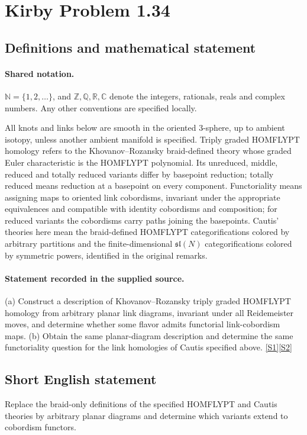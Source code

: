 \documentclass[11pt]{article}
\newcommand{\sref}[2]{\hyperlink{source:#1:#2}{[S#2]}}
\begin{document}
\section{Kirby Problem 1.34}\label{statement}

\subsection{Definitions and mathematical statement}

\paragraph{Shared notation.}$\mathbb N=\{1,2,\ldots\}$, and $\mathbb Z,\mathbb Q,\mathbb R,\mathbb C$ denote the integers, rationals, reals and complex numbers. Any other conventions are specified locally.


All knots and links below are smooth in the oriented $3$-sphere, up to ambient isotopy, unless another ambient manifold is specified. Triply graded HOMFLYPT homology refers to the Khovanov--Rozansky braid-defined theory whose graded Euler characteristic is the HOMFLYPT polynomial. Its unreduced, middle, reduced and totally reduced variants differ by basepoint reduction; totally reduced means reduction at a basepoint on every component. Functoriality means assigning maps to oriented link cobordisms, invariant under the appropriate equivalences and compatible with identity cobordisms and composition; for reduced variants the cobordisms carry paths joining the basepoints. Cautis' theories here mean the braid-defined HOMFLYPT categorifications colored by arbitrary partitions and the finite-dimensional $\mathfrak{sl}(N)$ categorifications colored by symmetric powers, identified in the original remarks.
\paragraph{Statement recorded in the supplied source.}
(a) Construct a description of Khovanov--Rozansky triply graded HOMFLYPT homology from arbitrary planar link diagrams, invariant under all Reidemeister moves, and determine whether some flavor admits functorial link-cobordism maps. (b) Obtain the same planar-diagram description and determine the same functoriality question for the link homologies of Cautis specified above. \sref{statement}{1}\sref{statement}{2}
\subsection{Short English statement}
Replace the braid-only definitions of the specified HOMFLYPT and Cautis theories by arbitrary planar diagrams and determine which variants extend to cobordism functors.
\end{document}

